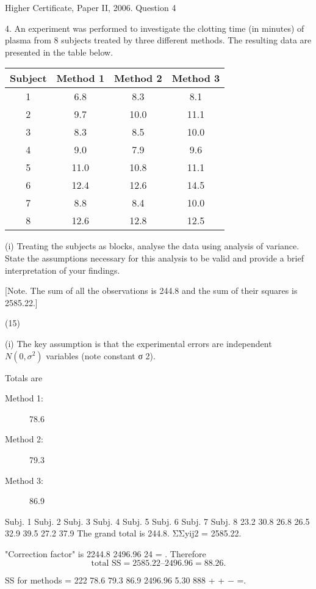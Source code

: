 \documentclass[a4paper,12pt]{article}
\begin{document}
Higher Certificate, Paper II, 2006.  Question 4 
 \begin{framed}
 4. An experiment was performed to investigate the clotting time (in minutes) of plasma from 8 subjects treated by three different methods.  The resulting data are presented in the table below. 

\begin{tabular}{|c|c|c|c|} 
Subject & Method 1 & Method 2 & Method 3 \\ \hline
1  & 6.8 &  8.3 &  8.1 \\
2  & 9.7 &10.0 &11.1 \\
3  & 8.3  & 8.5& 10.0 \\
4 &  9.0  & 7.9 &  9.6 \\
5 & 11.0 &10.8 &11.1 \\
6 & 12.4 &12.6 &14.5 \\
7 &  8.8  & 8.4 &10.0 \\
8 & 12.6 & 12.8& 12.5 \\
\end{tabular}
 
 
(i) Treating the subjects as blocks, analyse the data using analysis of variance.  State the assumptions necessary for this analysis to be valid and provide a brief interpretation of your findings. 
 
[Note.  The sum of all the observations is 244.8 and the sum of their squares is 2585.22.] 
 
(15) 
 
 

 \end{framed}
 
(i) The key assumption is that the experimental errors are independent $N(0, \sigma^2)$ variables (note constant σ 2). 
 
Totals are 
\begin{description}
\item[Method 1:] 78.6
\item[Method 2:] 79.3
\item[Method 3:] 86.9
\end{description} 
 
 
Subj. 1 Subj. 2 Subj. 3 Subj. 4 Subj. 5 Subj. 6 Subj. 7 Subj. 8 23.2 30.8 26.8 26.5 32.9 39.5 27.2 37.9 
 The grand total is 244.8.     ΣΣyij2 = 2585.22. 
 
"Correction factor" is 
2244.8 2496.96 24 = . 
 Therefore 
 \[ \mbox{total SS} = 2585.22 – 2496.96 = 88.26.\] 
 
SS for methods = 
222 78.6 79.3 86.9 2496.96 5.30 888 + + − =. 
 
\end{document}
